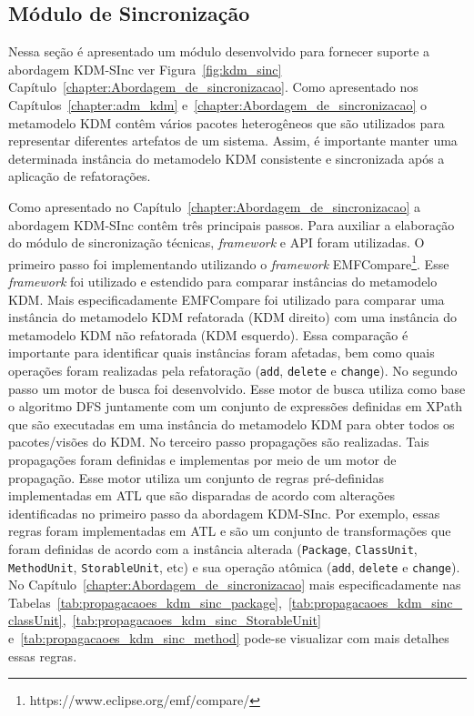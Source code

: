 \subsection{Módulo de Sincronização}

Nessa seção é apresentado um módulo desenvolvido para fornecer suporte a abordagem KDM-SInc ver Figura~\ref{fig:kdm_sinc} Capítulo~\ref{chapter:Abordagem_de_sincronizacao}. Como apresentado nos Capítulos~\ref{chapter:adm_kdm} e~\ref{chapter:Abordagem_de_sincronizacao} o metamodelo KDM contêm vários pacotes heterogêneos que são utilizados para representar diferentes artefatos de um sistema. Assim, é importante manter uma determinada instância do metamodelo KDM consistente e sincronizada após a aplicação de refatorações. 

Como apresentado no Capítulo~\ref{chapter:Abordagem_de_sincronizacao} a abordagem KDM-SInc contêm três principais passos. Para auxiliar a elaboração do módulo de sincronização técnicas, \textit{framework} e API foram utilizadas. O primeiro passo foi implementando utilizando o \textit{framework} EMFCompare\footnote{https://www.eclipse.org/emf/compare/}. Esse \textit{framework} foi utilizado e estendido para comparar instâncias do metamodelo KDM. Mais especificadamente EMFCompare foi utilizado para comparar uma instância do metamodelo KDM refatorada (KDM direito) com uma instância do metamodelo KDM não refatorada (KDM esquerdo). Essa comparação é importante para identificar quais instâncias foram afetadas, bem como quais operações foram realizadas pela refatoração (\texttt{add}, \texttt{delete} e \texttt{change}). No segundo passo um motor de busca foi desenvolvido. Esse motor de busca utiliza como base o algoritmo DFS juntamente com um conjunto de expressões definidas em XPath que são executadas em uma instância do metamodelo KDM para obter todos os pacotes/visões do KDM. No terceiro passo propagações são realizadas. Tais propagações foram definidas e implementas por meio de um motor de propagação. Esse motor utiliza um conjunto de regras pré-definidas implementadas em ATL que são disparadas de acordo com alterações identificadas no primeiro passo da abordagem KDM-SInc. Por exemplo, essas regras foram implementadas em ATL e são um conjunto de transformações que foram definidas de acordo com a instância alterada (\texttt{Package}, \texttt{ClassUnit}, \texttt{MethodUnit}, \texttt{StorableUnit}, etc) e sua operação atômica (\texttt{add}, \texttt{delete} e \texttt{change}). No Capítulo~\ref{chapter:Abordagem_de_sincronizacao} mais especificadamente nas Tabelas~\ref{tab:propagacaoes_kdm_sinc_package},~\ref{tab:propagacaoes_kdm_sinc_classUnit},~\ref{tab:propagacaoes_kdm_sinc_StorableUnit} e~\ref{tab:propagacaoes_kdm_sinc_method} pode-se visualizar com mais detalhes essas regras.

